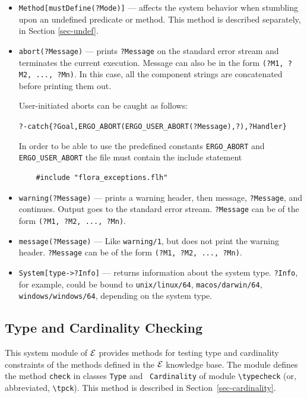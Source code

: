 \documentclass[11pt]{article}
\newcommand{\ERGO}{\mbox{\ensuremath{\cal{E}}\smaller{{\sc{RGO}}}}\xspace}
\newcommand{\FLSYSTEM}{\ERGO}
\newcommand{\FLABORT}{ERGO\_ABORT}
\newcommand{\FLUSERABORT}{ERGO\_USER\_ABORT}
\newcommand{\bs}{\textbackslash}
\begin{document}
\begin{itemize}
\item \texttt{Method[mustDefine(?Mode)]} --- affects the system behavior when
  stumbling upon an undefined predicate or method. This method is described
  separately, in Section \ref{sec-undef}.
  \item  {\tt abort(?Message)} --- prints {\tt ?Message} on the standard error
  stream and terminates the current execution. Message can also be in the
  form {\tt (?M1, ?M2, ..., ?Mn)}. In this case, all the component strings are
  concatenated before printing them out.

  User-initiated aborts can be caught as follows:
  \begin{alltt}
   ?- catch\{?Goal, \FLABORT(\FLUSERABORT(?Message),?), ?Handler\}
  \end{alltt}
  In order to be able to use the predefined constants {\tt \FLABORT} and
  {\tt \FLUSERABORT} the file must contain the include statement
  \begin{verbatim}
    #include "flora_exceptions.flh"    
  \end{verbatim}
\item {\tt warning(?Message)} --- prints a warning header, then message,
  {\tt ?Message}, and continues. Output goes to the standard error
  stream. {\tt ?Message} can be of the form {\tt (?M1, ?M2, ..., ?Mn)}.
\item {\tt message(?Message)} --- Like {\tt warning/1}, but does not print
  the warning header. {\tt ?Message} can be of the form {\tt (?M1, ?M2, ..., ?Mn)}.
\item \texttt{System[type->?Info]} --- returns information about the 
  system type. \texttt{?Info}, for example, could be bound to
  \texttt{unix/linux/64},
  \texttt{macos/darwin/64}, \texttt{windows/windows/64}, depending on the
  system type.
\end{itemize}


\subsection{Type and Cardinality Checking}\label{sec-type-sysmod}

This system module of \FLSYSTEM provides methods for testing type and
cardinality
constraints of the methods defined in the \FLSYSTEM knowledge base.  The
module defines the method {\tt check} in classes \texttt{Type} and  {\tt
  Cardinality} of module {\tt \bs{}typecheck} (or, abbreviated,
\texttt{\bs{}tpck}).  This method is described in
Section~\ref{sec-cardinality}.
\end{document}

